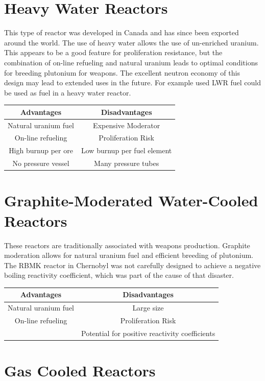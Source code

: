 \section{Heavy Water Reactors}
This type of reactor was developed in Canada and has since been exported around the world. The use of heavy water allows the use of un-enriched uranium. This appears to be a good feature for proliferation resistance, but the combination of on-line refueling and natural uranium leads to optimal conditions for breeding plutonium for weapons. 
The excellent neutron economy of this design may lead to extended uses in the future. For example used LWR fuel could be used as fuel in a heavy water reactor.
\begin{table}[!h]
\begin{tabular}{c|c}
  Advantages & Disadvantages \\
  \hline
  Natural uranium fuel & Expensive Moderator \\
  On-line refueling & Proliferation Risk \\
  High burnup per ore & Low burnup per fuel element \\
  No pressure vessel & Many pressure tubes \\
\end{tabular}
\end{table}

\section{Graphite-Moderated Water-Cooled Reactors}
These reactors are traditionally associated with weapons production. Graphite moderation allows for natural uranium fuel and efficient breeding of plutonium. The RBMK reactor in Chernobyl was not carefully designed to achieve a negative boiling reactivity coefficient, which was part of the cause of that disaster.
\begin{table}[!h]
\begin{tabular}{c|c}
  Advantages & Disadvantages \\
  \hline
  Natural uranium fuel & Large size \\
  On-line refueling & Proliferation Risk \\
  & Potential for positive reactivity coefficients \\
\end{tabular}
\end{table}

\section{Gas Cooled Reactors}

